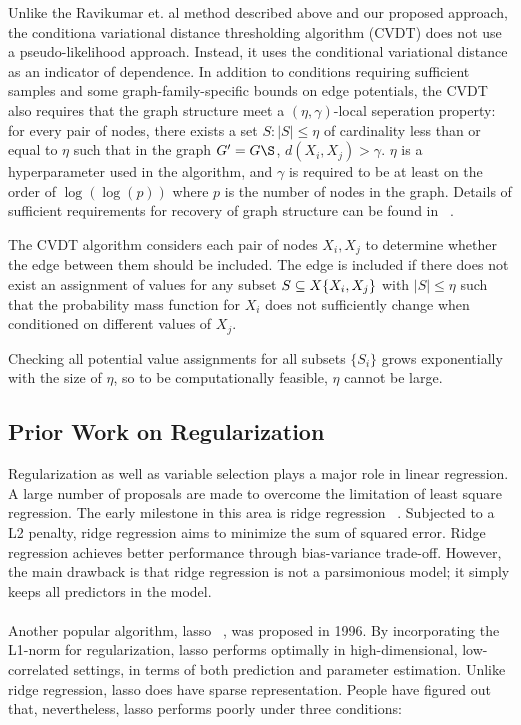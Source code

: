 \documentclass[11pt]{article}
\begin{document}
Unlike the Ravikumar et. al method described above and our proposed approach, the conditiona variational distance thresholding algorithm (CVDT) \cite{anandkumar2012high} does not use a pseudo-likelihood approach.  Instead, it uses the conditional variational distance as an indicator of dependence. In addition to conditions requiring sufficient samples and some graph-family-specific bounds on edge potentials, the CVDT also requires that the graph structure meet a $(\eta,\gamma)$-local seperation property: for every pair of nodes, there exists a set $S: |S| \leq \eta$ of cardinality less than or equal to $\eta$ such that in the graph $G' = G\S$, $d(X_i,X_j) > \gamma$. $\eta$ is a hyperparameter used in the algorithm, and $\gamma$ is required to be at least on the order of $\log(\log(p))$ where $p$ is the number of nodes in the graph. Details of sufficient requirements for recovery of graph structure can be found in ~\cite{anandkumar2012high}.

The CVDT algorithm considers each pair of nodes $X_i,X_j$ to determine whether the edge between them should be included.  The edge is included if there does not exist an assignment of values for any subset $S \subseteq X\\\{X_i,X_j\}$ with $|S| \leq \eta$ such that the probability mass function for $X_i$ does not sufficiently change when conditioned on different values of $X_j$.


Checking all potential value assignments for all subsets $\{S_i\}$ grows exponentially with the size of $\eta$, so to be computationally feasible, $\eta$ cannot be large. 




\subsection{Prior Work on Regularization}

Regularization as well as variable selection plays a major role in linear regression. A large number of proposals are made to overcome the limitation of least square regression. The early milestone in this area is ridge regression ~\cite{AEHoerl1970ridge}. Subjected to a L2 penalty, ridge regression aims to minimize the sum of squared error. Ridge regression achieves better performance through bias-variance trade-off. However, the main drawback is that ridge regression is not a parsimonious model; it simply keeps all predictors in the model. 
\\ \\
Another popular algorithm, lasso ~\cite{tibshirani1996regression}, was proposed in 1996. By incorporating the L1-norm for regularization, lasso performs optimally in high-dimensional, low-correlated settings, in terms of both prediction and parameter estimation. Unlike ridge regression, lasso does have sparse representation. People have figured out that, nevertheless, lasso performs poorly under three conditions:
\end{document}
